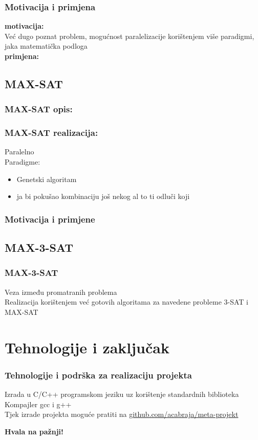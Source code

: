 \documentclass{beamer}
\begin{document}
\begin{frame}
 \frametitle{Motivacija i primjena}
 \textbf{motivacija:}\\
 Već dugo poznat problem, mogućnost paralelizacije korištenjem više paradigmi, jaka matematička podloga\\
 \textbf{primjena:}
\end{frame}
\subsection{MAX-SAT}
\begin{frame}
 \frametitle{MAX-SAT opis:}
\end{frame}

\begin{frame}
 \frametitle{MAX-SAT realizacija:}
 Paralelno\\
 Paradigme:
 \begin{itemize}
  \item Genetski algoritam
  \item ja bi pokušao kombinaciju još nekog al to ti odluči koji
 \end{itemize}
\end{frame}
 

\begin{frame}
 \frametitle{Motivacija i primjene}
\end{frame}

\subsection{MAX-3-SAT}
\begin{frame}
 \frametitle{MAX-3-SAT}
 Veza između promatranih problema \\
 Realizacija korištenjem već gotovih algoritama za navedene probleme 3-SAT i MAX-SAT
\end{frame}

\section{Tehnologije i zaključak}
\begin{frame}
 \frametitle{Tehnologije i podrška za realizaciju projekta}
 Izrada u C/C++ programskom jeziku uz korištenje standardnih biblioteka \\
 Kompajler gcc i g++\\
 Tjek izrade projekta moguće pratiti na \url{ github.com/acabraja/meta-projekt}
\end{frame}

\begin{frame}
 \begin{center}
  \textbf{Hvala na pažnji!}
 \end{center}
\end{frame}
\end{document}
